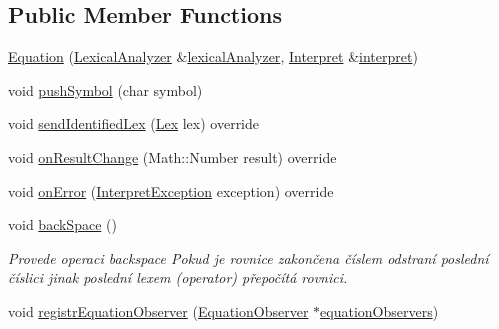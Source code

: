 \subsection*{Public Member Functions}
\begin{DoxyCompactItemize}
\item 
\hyperlink{classteam22_1_1_calc_1_1_equation_a085dc8be6e009511735b8c317d951610}{Equation} (\hyperlink{classteam22_1_1_calc_1_1_lexical_analyzer}{Lexical\+Analyzer} \&\hyperlink{classteam22_1_1_calc_1_1_equation_a65aeaa2a279994b03517a22addf31fc1}{lexical\+Analyzer}, \hyperlink{classteam22_1_1_calc_1_1_interpret}{Interpret} \&\hyperlink{classteam22_1_1_calc_1_1_equation_a8812a84e9c0f194eba491b0dba0cb015}{interpret})
\item 
void \hyperlink{classteam22_1_1_calc_1_1_equation_a324bf6372508c1b931c5ad8f39ccf8c4}{push\+Symbol} (char symbol)
\item 
void \hyperlink{classteam22_1_1_calc_1_1_equation_ad5768951865500ec7fc514f676de2851}{send\+Identified\+Lex} (\hyperlink{classteam22_1_1_calc_1_1_lex}{Lex} lex) override
\item 
void \hyperlink{classteam22_1_1_calc_1_1_equation_a302c295e099f589897a1bad4b02d3de8}{on\+Result\+Change} (Math\+::\+Number result) override
\item 
void \hyperlink{classteam22_1_1_calc_1_1_equation_a4e7a0614867931bcc714440441cdd894}{on\+Error} (\hyperlink{class_interpret_exception}{Interpret\+Exception} exception) override
\item 
void \hyperlink{classteam22_1_1_calc_1_1_equation_acccaaf8d823e6f1b7f6831fc0c8c4a62}{back\+Space} ()
\begin{DoxyCompactList}\small\item\em Provede operaci backspace Pokud je rovnice zakončena číslem odstraní poslední číslici jinak poslední lexem (operator) přepočítá rovnici. \end{DoxyCompactList}\item 
void \hyperlink{classteam22_1_1_calc_1_1_equation_a705c26d64f67f673e4919494d7e22d4a}{registr\+Equation\+Observer} (\hyperlink{classteam22_1_1_calc_1_1_equation_observer}{Equation\+Observer} $\ast$\hyperlink{classteam22_1_1_calc_1_1_equation_a76439666b11701dd1c42507397c5a316}{equation\+Observers})
\end{DoxyCompactItemize}
